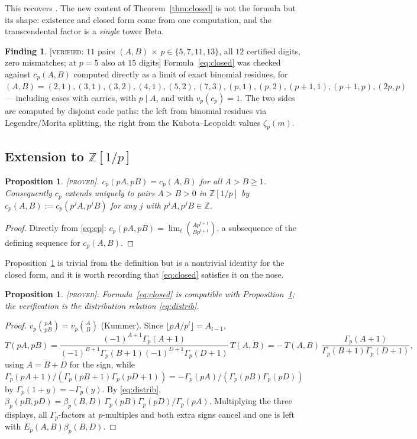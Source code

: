 \documentclass[11pt,reqno]{article}
\newcommand{\ZZ}{\mathbb{Z}}
\newcommand{\Gp}{\Gamma_p}
\newcommand{\bet}{\beta_p}
\newcommand{\vp}{v_p}
\newcommand{\bin}[2]{\binom{#1}{#2}}
\newcommand{\floor}[1]{\lfloor #1 \rfloor}
\newcommand{\PROVED}{{\normalfont\textsc{[proved]}}}
\newcommand{\VER}[1]{{\normalfont\textsc{[verified:} #1\textsc{]}}}
\theoremstyle{plain}
\newtheorem{proposition}[theorem]{Proposition}
\theoremstyle{definition}
\newtheorem{finding}[theorem]{Finding}
\theoremstyle{remark}
\numberwithin{equation}{section}
\begin{document}
This recovers \cite[Cor.~6.4]{PaperC}.  The new content of
Theorem~\ref{thm:closed} is not the formula but its shape: existence and closed
form come from one computation, and the transcendental factor is a
\emph{single} tower Beta.

\begin{finding}\label{find:closedver}
\VER{$11$ pairs $(A,B)$ $\times$ $p\in\{5,7,11,13\}$, all $12$ certified digits,
zero mismatches; at $p=5$ also at $15$ digits}  Formula~\eqref{eq:closed} was
checked against $c_p(A,B)$ computed directly as a limit of exact binomial
residues, for
$(A,B)=(2,1),(3,1),(3,2),(4,1),(5,2),(7,3),(p,1),(p,2),(p+1,1),(p+1,p),(2p,p)$
--- including cases with carries, with $p\mid A$, and with $\vp(c_p)=1$.  The
two sides are computed by disjoint code paths: the left from binomial residues
via Legendre/Morita splitting, the right from the Kubota--Leopoldt values
$\zeta_p(m)$.
\end{finding}

\subsection{Extension to $\ZZ[1/p]$}

\begin{proposition}\label{prop:homog}
\PROVED.  $c_p(pA,pB)=c_p(A,B)$ for all $A>B\ge1$.  Consequently $c_p$ extends
uniquely to pairs $A>B>0$ in $\ZZ[1/p]$ by $c_p(A,B):=c_p(p^jA,p^jB)$ for any
$j$ with $p^jA,p^jB\in\ZZ$.
\end{proposition}

\begin{proof}
Directly from \eqref{eq:cp}: $c_p(pA,pB)=\lim_t\bin{Ap^{t+1}}{Bp^{t+1}}$, a
subsequence of the defining sequence for $c_p(A,B)$.
\end{proof}

Proposition~\ref{prop:homog} is trivial from the definition but is a nontrivial
identity for the closed form, and it is worth recording that
\eqref{eq:closed} satisfies it on the nose.

\begin{proposition}\label{prop:homog-check}
\PROVED.  Formula~\eqref{eq:closed} is compatible with
Proposition~\ref{prop:homog}; the verification is the distribution relation
\eqref{eq:distrib}.
\end{proposition}

\begin{proof}
$\vp\bin{pA}{pB}=\vp\bin AB$ (Kummer).  Since $\floor{pA/p^l}=A_{l-1}$,
\[
  T(pA,pB)=\frac{(-1)^{A+1}\Gp(A+1)}
                {(-1)^{B+1}\Gp(B+1)(-1)^{D+1}\Gp(D+1)}\,T(A,B)
          =-\,T(A,B)\,\frac{\Gp(A+1)}{\Gp(B+1)\Gp(D+1)},
\]
using $A=B+D$ for the sign, while
$\Gp(pA+1)/(\Gp(pB+1)\Gp(pD+1))=-\Gp(pA)/(\Gp(pB)\Gp(pD))$ by
$\Gp(1+y)=-\Gp(y)$.  By \eqref{eq:distrib},
$\bet(pB,pD)=\bet(B,D)\,\Gp(pB)\Gp(pD)/\Gp(pA)$.  Multiplying the three
displays, all $\Gp$-factors at $p$-multiples and both extra signs cancel and one
is left with $E_p(A,B)\bet(B,D)$.
\end{proof}
\end{document}
